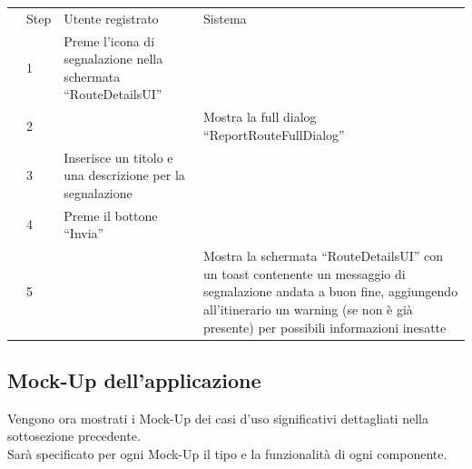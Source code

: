 \documentclass{natourDoc}
\begin{document}
\begin{tabularx}{\linewidth}{|l| p{1cm} | p{4cm} | X |}
	\hline
	\multirow{2}{*}{}
	                              & Step                                                 & Utente registrato                                                 & Sistema                                                                          \\

	\cline{2-4}                   & 1                                                    & Preme l'icona di segnalazione nella schermata “RouteDetailsUI” &                                                                                  \\

	\cline{2-4}                   & 2                                                    &                                                                   & Mostra la full dialog “ReportRouteFullDialog”                                    \\

	\cline{2-4}                   & 3                                                    & Inserisce un titolo e una descrizione per la segnalazione           &                                                                                  \\

	\cline{2-4}                   & 4                                                    & Preme il bottone “Invia”                                          &                                                                                  \\

	\cline{2-4}                   & 5                                                    &                                                                   & Mostra la schermata “RouteDetailsUI” con un toast contenente un messaggio di segnalazione andata a buon fine,
	aggiungendo all’itinerario un warning (se non è già presente) per possibili informazioni inesatte                                                                                                                                           \\

	\hline
\end{tabularx}

\newpage
\subsection{Mock-Up dell'applicazione}
Vengono ora mostrati i Mock-Up dei casi d'uso significativi dettagliati nella sottosezione precedente.\\
Sarà specificato per ogni Mock-Up il tipo e la funzionalità di ogni componente.
\end{document}
